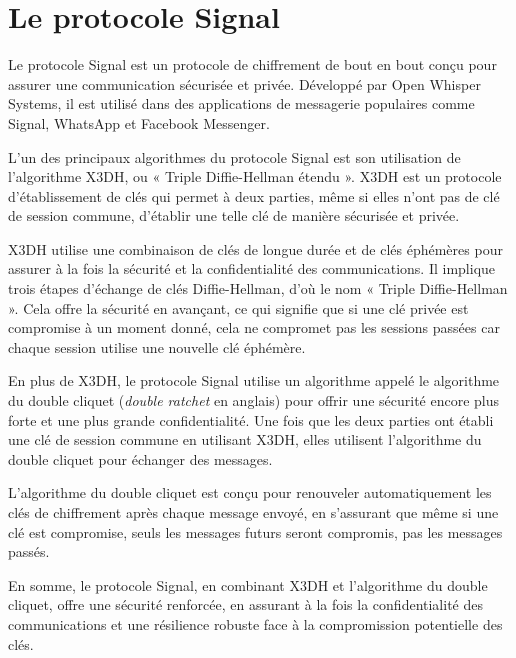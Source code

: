 
\section{Le protocole Signal} %
\label{sec:signal}

Le protocole Signal est un protocole de chiffrement de bout en bout conçu pour assurer une communication sécurisée et privée. Développé par Open Whisper Systems, il est utilisé dans des applications de messagerie populaires comme Signal, WhatsApp et Facebook Messenger.\par

L'un des principaux algorithmes du protocole Signal est son utilisation de l'algorithme X3DH, ou « Triple Diffie-Hellman étendu ». X3DH est un protocole d'établissement de clés qui permet à deux parties, même si elles n'ont pas de clé de session commune, d'établir une telle clé de manière sécurisée et privée.\par

X3DH utilise une combinaison de clés de longue durée et de clés éphémères pour assurer à la fois la sécurité et la confidentialité des communications. Il implique trois étapes d’échange de clés Diffie-Hellman, d’où le nom « Triple Diffie-Hellman ». Cela offre la sécurité en avançant, ce qui signifie que si une clé privée est compromise à un moment donné, cela ne compromet pas les sessions passées car chaque session utilise une nouvelle clé éphémère.\par

En plus de X3DH, le protocole Signal utilise un algorithme appelé le algorithme du double cliquet (\emph{double ratchet} en anglais) pour offrir une sécurité encore plus forte et une plus grande confidentialité. Une fois que les deux parties ont établi une clé de session commune en utilisant X3DH, elles utilisent l'algorithme du double cliquet pour échanger des messages.\par

L'algorithme du double cliquet est conçu pour renouveler automatiquement les clés de chiffrement après chaque message envoyé, en s'assurant que même si une clé est compromise, seuls les messages futurs seront compromis, pas les messages passés.

En somme, le protocole Signal, en combinant X3DH et l'algorithme du double cliquet, offre une sécurité renforcée, en assurant à la fois la confidentialité des communications et une résilience robuste face à la compromission potentielle des clés.\par


